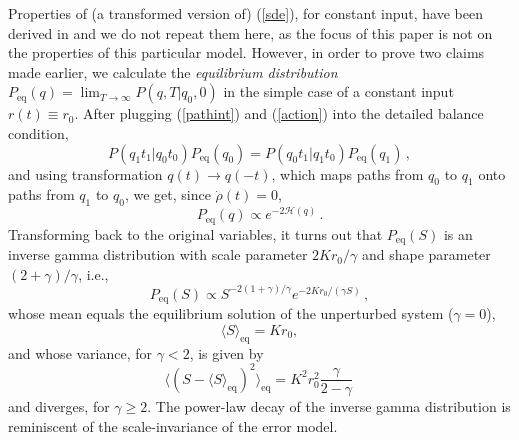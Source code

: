 \documentclass[12pt,a4paper,final]{iopart}
\newcommand{\eq}{\mbox{eq}}
\begin{document}
Properties of (a transformed version of) (\ref{sde}), for constant input, have been derived in \cite{dutre_1977_SDE, schenzle_1979_multStochProc, fujisaka_1986_intermittency} and we do not repeat them here, as the focus of this paper is not on the properties of this particular model. However, in order to prove two claims made earlier, we calculate the {\em equilibrium distribution} $P_{\eq}(q) = \lim_{T\rightarrow\infty} P(q,T|q_0,0)$ in the simple case of a constant input $r(t)\equiv r_{0}$. After plugging (\ref{pathint}) and (\ref{action}) into the detailed balance condition,
\begin{equation}\label{detailed_balance}
P(q_1 t_1 | q_0 t_0 ) P_{\eq}(q_0) = P(q_0 t_1 | q_1 t_0 ) P_{\eq}(q_1) \,,
\end{equation}
and using transformation $q(t) \rightarrow q(-t)$, which maps paths from $q_0$ to $q_1$ onto paths from $q_1$ to $q_0$, we get, since $\dot\rho(t)= 0$,
\begin{equation}\label{Peq}
  P_{\eq}(q)
  \propto
  e^{-2\mathcal{H}(q)}\,.
\end{equation}
Transforming back to the original variables, it turns out that $P_{\eq}(S)$ is an inverse gamma distribution with scale parameter $2Kr_{0}/\gamma$ and shape parameter $(2+\gamma)/\gamma$, i.e.,
\begin{equation}\label{inverse_gamma}
  P_{\eq}(S)
  \propto
  S^{-2(1+\gamma)/\gamma}e^{-2Kr_{0}/(\gamma S)}\,,
\end{equation}
whose mean equals the equilibrium solution of the unperturbed system ($\gamma=0$),
\begin{equation}\label{equilibrium_mean}
  \langle S\rangle_{\eq}=Kr_{0},
\end{equation}
and whose variance, for $\gamma< 2$, is given by
\begin{equation}
  \langle (S - \langle S\rangle_{\eq})^2\rangle_{\eq}
  =
  K^2r_{0}^2
  \frac{\gamma}{2-\gamma}\,
\end{equation}
and diverges, for $\gamma\geq 2$.
The power-law decay of the inverse gamma distribution is reminiscent of the scale-invariance of the error model.
\end{document}
